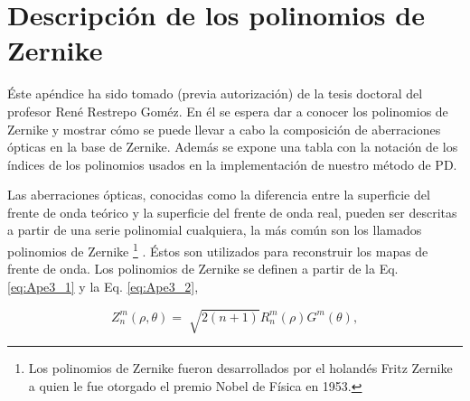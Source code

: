 



\chapter{Descripción de los polinomios de Zernike}
\label{cha:AppendixC}

\graphicspath{{Figures/ApendiceC/}{../Figures/ApendiceC/}}

Éste apéndice ha sido tomado (previa autorización) de la tesis doctoral del profesor René
Restrepo Goméz. En él se espera dar a conocer los polinomios de
Zernike y mostrar cómo se puede llevar a cabo la composición de aberraciones ópticas en la base
de Zernike. Además se expone una tabla con la notación de los índices
de los polinomios usados en la implementación de nuestro método
de PD.   

Las aberraciones ópticas, conocidas como la diferencia entre la superficie del frente de onda teórico y la superficie del frente de onda real, pueden ser descritas a partir de una serie polinomial cualquiera, la más común son los llamados polinomios de Zernike \footnote[3]{Los polinomios de Zernike fueron desarrollados por el holandés Fritz Zernike a quien le fue otorgado el premio Nobel de Física en 1953.} . Éstos son utilizados para reconstruir los mapas de frente de onda. Los polinomios de Zernike se  definen a partir de la Eq. \ref{eq:Ape3_1}  y la Eq. \ref{eq:Ape3_2},

\begin{equation}\label{eq:Ape3_1}
 Z_{n}^{m}(\rho,\theta) = \sqrt[]{2(n+1)} R_{n}^{m}(\rho)G^{m}(\theta),
\end{equation}

